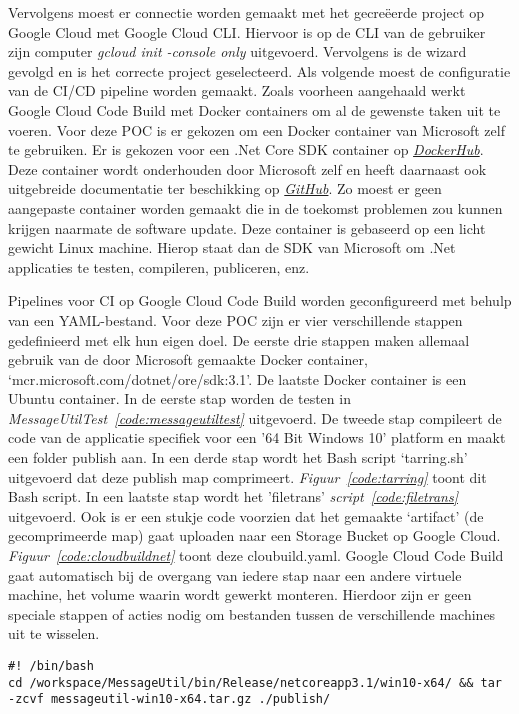 Vervolgens moest er connectie worden gemaakt met het gecreëerde project op Google Cloud met Google Cloud CLI. Hiervoor is op de CLI van de gebruiker zijn computer \emph{gcloud init -console only} uitgevoerd. Vervolgens is de wizard gevolgd en is het correcte project geselecteerd. Als volgende moest de configuratie van de CI/CD pipeline worden gemaakt. Zoals voorheen aangehaald werkt Google Cloud Code Build met Docker containers om al de gewenste taken uit te voeren. Voor deze POC is er gekozen om een Docker container van Microsoft zelf te gebruiken. Er is gekozen voor een .Net Core SDK container op \emph{\href{https://hub.docker.com/_/microsoft-dotnet-core-sdk}{DockerHub}}. Deze container wordt onderhouden door Microsoft zelf en heeft daarnaast ook uitgebreide documentatie ter beschikking op \emph{\href{https://github.com/dotnet/dotnet-docker/blob/master/samples/README.md}{GitHub}}. Zo moest er geen aangepaste container worden gemaakt die in de toekomst problemen zou kunnen krijgen naarmate de software update. Deze container is gebaseerd op een licht gewicht Linux machine. Hierop staat dan de SDK van Microsoft om .Net applicaties te testen, compileren, publiceren, enz.

Pipelines voor CI op Google Cloud Code Build worden geconfigureerd met behulp van een YAML-bestand. Voor deze POC zijn er vier verschillende stappen gedefinieerd met elk hun eigen doel. De eerste drie stappen maken allemaal gebruik van de door Microsoft gemaakte Docker container, ‘mcr.microsoft.com/dotnet/ore/sdk:3.1’. De laatste Docker container is een Ubuntu container. In de eerste stap worden de testen in \emph{MessageUtilTest~\ref{code:messageutiltest}} uitgevoerd. De tweede stap compileert de code van de applicatie specifiek voor een '64 Bit Windows 10' platform en maakt een folder publish aan. In een derde stap wordt het Bash script ‘tarring.sh’ uitgevoerd dat deze publish map comprimeert. \emph{Figuur~\ref{code:tarring}} toont dit Bash script. In een laatste stap wordt het 'filetrans' \emph{script~\ref{code:filetrans}} uitgevoerd. Ook is er een stukje code voorzien dat het gemaakte ‘artifact’ (de gecomprimeerde map) gaat uploaden naar een Storage Bucket op Google Cloud. \emph{Figuur~\ref{code:cloudbuildnet}} toont deze cloubuild.yaml. Google Cloud Code Build gaat automatisch bij de overgang van iedere stap naar een andere virtuele machine, het volume waarin wordt gewerkt monteren. Hierdoor zijn er geen speciale stappen of acties nodig om bestanden tussen de verschillende machines uit te wisselen.

\begin{lstlisting}
#! /bin/bash
cd /workspace/MessageUtil/bin/Release/netcoreapp3.1/win10-x64/ && tar -zcvf messageutil-win10-x64.tar.gz ./publish/
\end{lstlisting}

